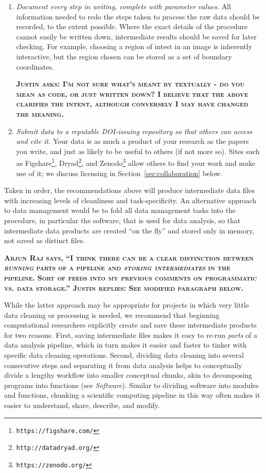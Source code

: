 \documentclass[10pt]{article}
\newcommand{\fixme}[1]{\textsc{\textbf{#1}}}
\newcommand{\recommend}[1]{\textit{#1}}
\newcommand{\withurl}[2]{{#1}\footnote{\texttt{#2}}}
\begin{document}
\begin{enumerate}
\item
  \recommend{Document every step in writing, complete with
    parameter values.} All information needed to redo
    the steps taken to process the raw data should be recorded,
    to the extent possible. Where the exact details of the procedure
    cannot easily be written down, intermediate results should be saved
    for later checking.  For example, choosing a region of intest in an
    image is inherently interactive, but the region chosen can be stored
    as a set of boundary coordinates.

  \fixme{Justin asks: I'm not sure what's meant by textually - do you mean as code, or just written down? I believe that the above clarifies the intent, although conversely I may have changed the meaning.}

\item
  \recommend{Submit data to a reputable DOI-issuing repository so that
    others can access and cite it.}  Your data is as much a product of
  your research as the papers you write, and just as likely to be
  useful to others (if not more so).  Sites such as
  \withurl{Figshare}{https://figshare.com/},
  \withurl{Dryad}{http://datadryad.org/}, and
  \withurl{Zenodo}{https://zenodo.org/} allow others to find your work
  and make use of it; we discuss licensing in
  Section~\ref{sec:collaboration} below.

\end{enumerate}

Taken in order, the recommendations above will produce intermediate
data files with increasing levels of cleanliness and
task-specificity. An alternative approach to data management would be
to fold all data management tasks into the procedure,
in particular the software,
that is used for data analysis,
so that intermediate data products are created ``on the fly''
and stored only in memory, not saved as distinct files.

\fixme{Arjun Raj says, ``I
  think there can be a clear distinction between \emph{running} parts
  of a pipeline and \emph{storing intermediates} in the pipeline. Sort
  of feeds into my previous comments on programmatic vs. data
  storage.'' Justin replies: See modified paragraph below.}

While the latter approach may be appropriate
for projects in which very little data cleaning or processing is needed,
we recommend that beginning computational researchers
explicitly create and save these intermediate products for two reasons.
First, saving intermediate files makes it easy
to re-run \emph{parts} of a data analysis pipeline,
which in turn makes it easier and faster to tinker
with specific data cleaning operations.
Second, dividing data cleaning into several consecutive steps
and separating it from data analysis helps to conceptually divide
a lengthy workflow into smaller conceptual chunks,
akin to decomposing programs into functions (see \textit{Software}).
Similar to dividing software into modules and functions,
chunking a scientific computing pipeline in this way
often makes it easier to understand, share, describe, and modify.
\end{document}
